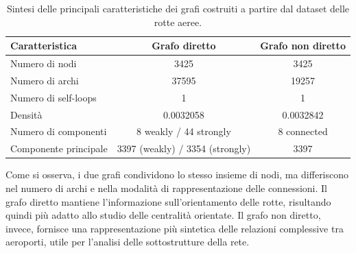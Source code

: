 \begin{table}[H]
\centering
\caption{Sintesi delle principali caratteristiche dei grafi costruiti a partire dal dataset delle rotte aeree.}
\label{tab:graph_summary}
\begin{tabular}{lcc}
\toprule
\textbf{Caratteristica} & \textbf{Grafo diretto} & \textbf{Grafo non diretto} \\
\midrule
Numero di nodi & 3425 & 3425 \\
Numero di archi & 37595 & 19257 \\
Numero di self-loops & 1 & 1 \\
Densità & 0.0032058 & 0.0032842 \\
Numero di componenti & 8 weakly / 44 strongly & 8 connected \\
Componente principale & 3397 (weakly) / 3354 (strongly) & 3397 \\
\bottomrule
\end{tabular}
\end{table}

Come si osserva, i due grafi condividono lo stesso insieme di nodi, ma differiscono nel numero di archi e nella modalità di rappresentazione delle connessioni. Il grafo diretto mantiene l’informazione sull’orientamento delle rotte, risultando quindi più adatto allo studio delle centralità orientate. Il grafo non diretto, invece, fornisce una rappresentazione più sintetica delle relazioni complessive tra aeroporti, utile per l’analisi delle sottostrutture della rete.
